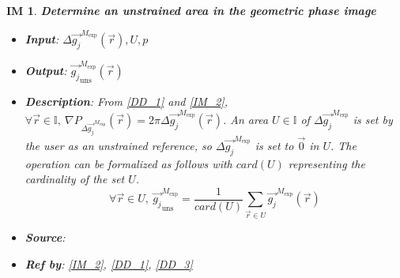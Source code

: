 \documentclass[12pt]{article}
\newtheorem{IM}{IM}
\begin{document}
\begin{IM}
\label{IM_3}
\noindent\colorbox{shadecolorIM}{\normalfont \textbf{Determine an unstrained area in the geometric phase image}}
\normalfont
\begin{itemize}
\item \textbf{Input}: $\Delta \overrightarrow{g_{j}}^{M_{\text{exp}}}(\vec{r}),U,p$
\item \textbf{Output}: $\overrightarrow{g_{j}}_{\text{uns}}^{M_{\text{exp}}}(\vec{r})$
\item \textbf{Description}: From \cref{DD_1} and \cref{IM_2}, $\forall \vec{r} \in \mathbb{I},\  \nabla P_{\Delta \overrightarrow{g_{j}}^{M_{\text{exp}}}} (\vec{r}) = 2\pi \Delta \overrightarrow{g_{j}}^{M_{\text{exp}}}(\vec{r})$. An area $U \in \mathbb{I}$ of $\Delta \overrightarrow{g_{j}}^{M_{\text{exp}}}$ is set by the user as an unstrained reference, so $\Delta \overrightarrow{g_{j}}^{M_{\text{exp}}}$ is set to $\overrightarrow{0}$ in $U$. The operation can be formalized as follows with $card(U)$ representing the cardinality of the set $U$.
\begin{equation}
\forall \vec{r} \in U, \ \overrightarrow{g_{j}}_{\text{uns}}^{M_{\text{exp}}}=\frac{1}{card(U)}\sum_{\vec{r}\in U}\overrightarrow{g_{j}}^{M_{\text{exp}}}(\vec{r})
\end{equation}
\item \textbf{Source}: \cite{Hytch1998}
\item \textbf{Ref by}: \cref{IM_2}, \cref{DD_1}, \cref{DD_3}
\end{itemize}
\end{IM}
\end{document}
